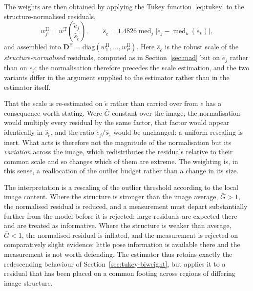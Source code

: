 The weights are then obtained by applying the Tukey function~\eqref{eq:tukey}
to the structure-normalised residuals,
\begin{equation}
    w^{\mathrm{H}}_{j}=w^{\mathrm{T}}\!\left(\frac{\tilde{e}_{j}}{\hat{s}_{\tilde{e}}}\right),
    \qquad
    \hat{s}_{\tilde{e}}=1.4826\operatorname{med}_{j}
    \bigl\lvert\tilde{e}_{j}-\operatorname{med}_{k}(\tilde{e}_{k})\bigr\rvert,
    \label{eq:hermite-weights}
\end{equation}
and assembled into
$\mathbf{D}^{\mathrm{H}}=\mathrm{diag}(w^{\mathrm{H}}_{1},\dots,w^{\mathrm{H}}_{P})$.
Here $\hat{s}_{\tilde{e}}$ is the robust scale of the
\emph{structure-normalised} residuals, computed as in
Section~\ref{sec:mad} but on $\tilde{e}_{j}$ rather than on $e_{j}$; the
normalisation therefore precedes the scale estimation, and the two variants
differ in the argument supplied to the estimator rather than in the estimator
itself.

That the scale is re-estimated on $\tilde{e}$ rather than carried over from
$e$ has a consequence worth stating. Were $\bar{G}$ constant over the image,
the normalisation would multiply every residual by the same factor, that
factor would appear identically in $\hat{s}_{\tilde{e}}$, and the ratio
$\tilde{e}_{j}/\hat{s}_{\tilde{e}}$ would be unchanged: a uniform rescaling is
inert. What acts is therefore not the magnitude of the normalisation but its
\emph{variation} across the image, which redistributes the residuals relative
to their common scale and so changes which of them are extreme. The
weighting is, in this sense, a reallocation of the outlier budget rather than
a change in its size.

The interpretation is a rescaling of the outlier threshold according to the
local image content. Where the structure is stronger than the image average,
$\bar{G}>1$, the normalised residual is reduced, and a measurement must depart
substantially further from the model before it is rejected: large residuals
are expected there and are treated as informative. Where the structure is
weaker than average, $\bar{G}<1$, the normalised residual is inflated, and the
measurement is rejected on comparatively slight evidence: little pose
information is available there and the measurement is not worth defending. The
estimator thus retains exactly the redescending behaviour of
Section~\ref{sec:tukey-biweight}, but applies it to a residual that has been
placed on a common footing across regions of differing image structure.

